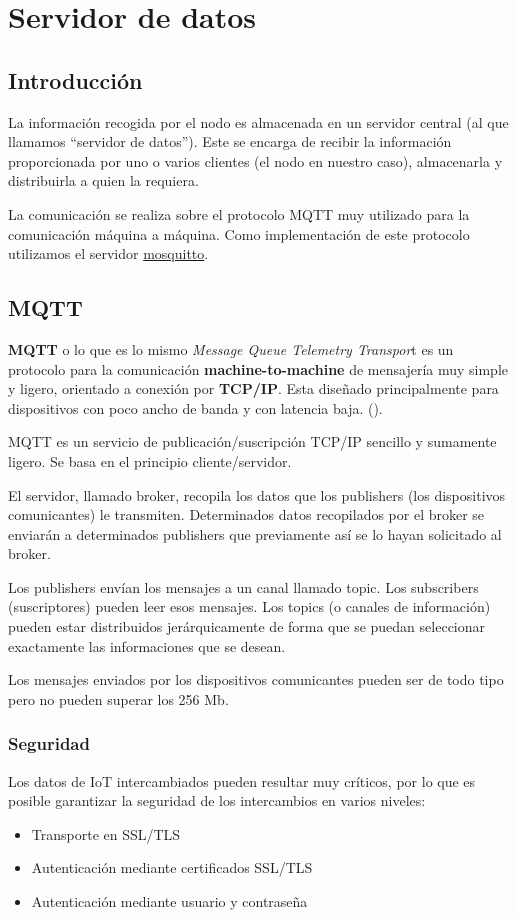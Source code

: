 \cleardoublepage

\chapter{Servidor de datos}
\label{makereference3}

\section{Introducción}
\label{makereference3.1}
La información recogida por el nodo es almacenada en un servidor central (al que llamamos ``servidor de datos''). Este se encarga de recibir la información proporcionada por uno o varios clientes (el nodo en nuestro caso), almacenarla y distribuirla a quien la requiera.

La comunicación se realiza sobre el protocolo MQTT muy utilizado para la comunicación máquina a máquina. Como implementación de este protocolo utilizamos el servidor \href{https://mosquitto.org/}{mosquitto}.

\section{MQTT}
\label{makereference3.2}
\textbf{MQTT} o lo que es lo mismo \textit{Message Queue Telemetry Transpor}t es un protocolo para la comunicación \textbf{machine-to-machine} de mensajería muy simple y ligero, orientado a conexión por \textbf{TCP/IP}. Esta diseñado principalmente para dispositivos con poco ancho de banda y con latencia baja. (\cite{ARP:Loy:1974}).

MQTT es un servicio de publicación/suscripción TCP/IP sencillo y sumamente ligero. Se basa en el principio cliente/servidor.

El servidor, llamado broker, recopila los datos que los publishers (los dispositivos comunicantes) le transmiten. Determinados datos recopilados por el broker se enviarán a determinados publishers que previamente así se lo hayan solicitado al broker.

Los publishers envían los mensajes a un canal llamado topic. Los subscribers (suscriptores) pueden leer esos mensajes. Los topics (o canales de información) pueden estar distribuidos jerárquicamente de forma que se puedan seleccionar exactamente las informaciones que se desean.

Los mensajes enviados por los dispositivos comunicantes pueden ser de todo tipo pero no pueden superar los 256 Mb.

\subsection{Seguridad}
Los datos de IoT intercambiados pueden resultar muy críticos, por lo que es posible garantizar la seguridad de los intercambios en varios niveles:
\begin{itemize}
\item Transporte en SSL/TLS
\item Autenticación mediante certificados SSL/TLS
\item Autenticación mediante usuario y contraseña
\end{itemize}

